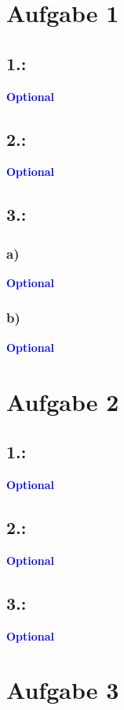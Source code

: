 \documentclass[a4paper,11pt]{scrartcl}
\title{\titleinfo}
\author{\authorinfo}
\newcommand{\opt}{\textcolor{blue}{\textbf{Optional}}}
\begin{document}
\maketitle
\section*{Aufgabe 1}
	\subsection*{1.:}
	\opt
	\subsection*{2.:}
	\opt
	\subsection*{3.:}
		\subsubsection*{a)}
		\opt
		\subsubsection*{b)}
		\opt
		
\section*{Aufgabe 2}
	\subsection*{1.:}
	\opt
	\subsection*{2.:}
	\opt
	\subsection*{3.:}
	\opt

\section*{Aufgabe 3}
\end{document}
